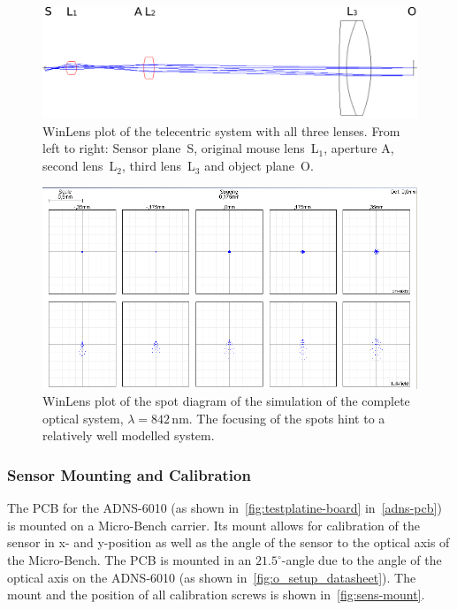 \documentclass[12pt,a4paper]{article}
\begin{document}
\begin{figure}[htbp]
\begin{center}
\includegraphics[width=1\columnwidth]{figures/lens_system_telecentric.pdf}
\caption{\label{fig:ls3_p}
WinLens plot of the telecentric system with all three lenses.
From left to right:
Sensor plane~S,
original mouse lens~L$_1$,
aperture A,
second lens~L$_2$,
third lens~L$_3$ and
object plane~O.
}
\end{center}
\end{figure}

\begin{figure}[htbp]
\begin{center}
\includegraphics[width=1\columnwidth]{figures/spot_diagram_telecentric.png}
\caption{\label{fig:ls3_s}
WinLens plot of the spot diagram of the simulation of the complete optical system, $\lambda = 842$\,nm.
The focusing of the spots hint to a relatively well modelled system.
}
\end{center}
\end{figure}

\subsubsection{Sensor Mounting and Calibration}
\label{semo}

The PCB for the ADNS-6010 (as shown in~\autoref{fig:testplatine-board} in~\autoref{adns-pcb}) is mounted on a Micro-Bench carrier.
Its mount allows for calibration of the sensor in x- and y-position as well as the angle of the sensor to the optical axis of the Micro-Bench.
The PCB is mounted in an $21.5^\circ$-angle due to the angle of the optical axis on the ADNS-6010 (as shown in~\autoref{fig:o_setup_datasheet}).
The mount and the position of all calibration screws is shown in~\autoref{fig:sens-mount}.
\end{document}
